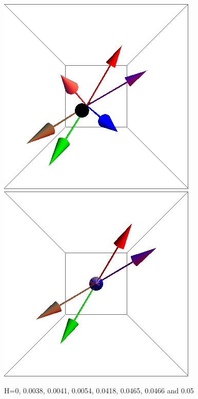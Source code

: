 \documentclass{article}
\begin{document}
\begin{figure}[ht]
\includegraphics[scale=0.22]{100/467S000to005G.png}
\includegraphics[scale=0.22]{100/501S000to005G.png}
\caption{H=0, 0.0038, 0.0041, 0.0054, 0.0418, 0.0465, 0.0466 and 0.05}
\end{figure}
\end{document}
